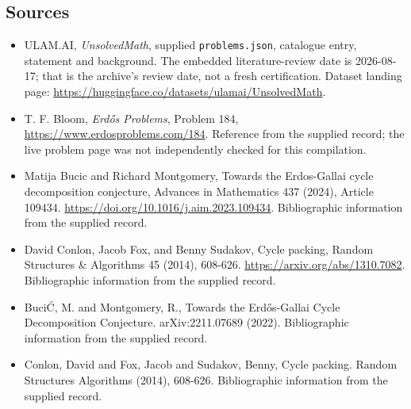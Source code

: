 \documentclass[11pt,a4paper]{article}
\begin{document}
\subsection{Sources}

{\small

\begin{itemize}

\item[\hypertarget{source:statement:1}{S1}] ULAM.AI, \emph{UnsolvedMath}, supplied \texttt{problems.json}, catalogue entry, statement and background. The embedded literature-review date is 2026-08-17; that is the archive’s review date, not a fresh certification. Dataset landing page: \url{https://huggingface.co/datasets/ulamai/UnsolvedMath}.

\item[\hypertarget{source:statement:2}{S2}] T. F. Bloom, \emph{Erdős Problems}, Problem 184, \url{https://www.erdosproblems.com/184}. Reference from the supplied record; the live problem page was not independently checked for this compilation.

\item[\hypertarget{source:statement:3}{S3}] Matija Bucic and Richard Montgomery, Towards the Erdos-Gallai cycle decomposition conjecture, Advances in Mathematics 437 (2024), Article 109434. \url{https://doi.org/10.1016/j.aim.2023.109434}. Bibliographic information from the supplied record.

\item[\hypertarget{source:statement:4}{S4}] David Conlon, Jacob Fox, and Benny Sudakov, Cycle packing, Random Structures \& Algorithms 45 (2014), 608-626. \url{https://arxiv.org/abs/1310.7082}. Bibliographic information from the supplied record.

\item[\hypertarget{source:statement:5}{S5}] Buci\'C, M. and Montgomery, R., Towards the Erd\H{o}s-Gallai Cycle Decomposition Conjecture. arXiv:2211.07689 (2022). Bibliographic information from the supplied record.

\item[\hypertarget{source:statement:6}{S6}] Conlon, David and Fox, Jacob and Sudakov, Benny, Cycle packing. Random Structures Algorithms (2014), 608-626. Bibliographic information from the supplied record.

\end{itemize}

}

\label{end:statement}
\end{document}
